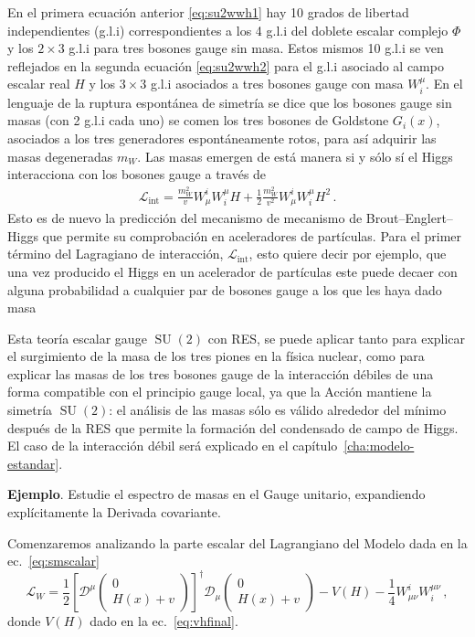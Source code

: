 En el primera ecuación anterior \eqref{eq:su2wwh1} hay 10 grados de libertad independientes (g.l.i) correspondientes a los 4 g.l.i del doblete escalar complejo $\Phi$ y los $2\times 3$ g.l.i para tres bosones gauge sin masa. Estos mismos 10 g.l.i se ven reflejados en la segunda ecuación \eqref{eq:su2wwh2} para el g.l.i asociado al campo escalar real $H$ y los $3\times 3$ g.l.i asociados a tres bosones gauge con masa $W_i^{\mu}$. En el lenguaje de la ruptura espontánea de simetría se dice que los bosones gauge sin masas (con 2 g.l.i cada uno) se comen los tres bosones de Goldstone $G_i(x)$, asociados a los tres generadores espontáneamente rotos, para así adquirir las masas degeneradas $m_W$. Las masas emergen de está manera si y sólo sí el Higgs interacciona con los bosones gauge a través de
\begin{align}
  \mathcal{L}_{\text{int}}=\frac{m_W^2}{v} W^i_{\mu}W^{\mu}_{i} H
     +\frac{1}{2} \frac{m_W^2}{v^2} W^i_{\mu}W^{\mu}_{i} H^2\,.
\end{align}
Esto es de nuevo la predicción del mecanismo de mecanismo de Brout–Englert–Higgs que permite su
comprobación en aceleradores de partículas. Para el primer término del
Lagragiano de interacción, $\mathcal{L}_{\text{int}}$, esto quiere
decir por ejemplo, que una vez producido el Higgs en un acelerador de
partículas este puede decaer con alguna probabilidad a cualquier par
de bosones gauge a los que les haya dado masa

Esta teoría escalar gauge $\operatorname{SU}(2)$ con RES, se puede aplicar tanto para explicar el surgimiento de la masa de los tres piones en la física nuclear, como para explicar las masas de los tres bosones gauge de la interacción débiles de una forma compatible con el principio gauge local, ya que la Acción mantiene la simetría $\operatorname{SU}(2)$: el análisis de las masas sólo es válido alrededor del mínimo después de la RES que permite la formación del condensado de campo de Higgs. El caso de la interacción débil será explicado en el capítulo~\ref{cha:modelo-estandar}.

\bigskip

\noindent
\textbf{Ejemplo}. Estudie el espectro de masas en el Gauge unitario, expandiendo explícitamente la Derivada covariante.

Comenzaremos analizando la parte escalar del Lagrangiano del Modelo dada en la ec.~\eqref{eq:smscalar}
\begin{equation}
  \mathcal{L}_{W}=\frac{1}{2}\left[\mathcal{D}^\mu \begin{pmatrix}
    0\\
    H(x)+v
  \end{pmatrix}\right]^{\dagger} \mathcal{D}_\mu\begin{pmatrix}
    0\\
    H(x)+v
  \end{pmatrix}-V(H)-\frac{1}{4}W_{\mu\nu}^i W_i^{\mu\nu}\,,
\end{equation}
donde $V(H)$ dado en la ec.~\eqref{eq:vhfinal}.

